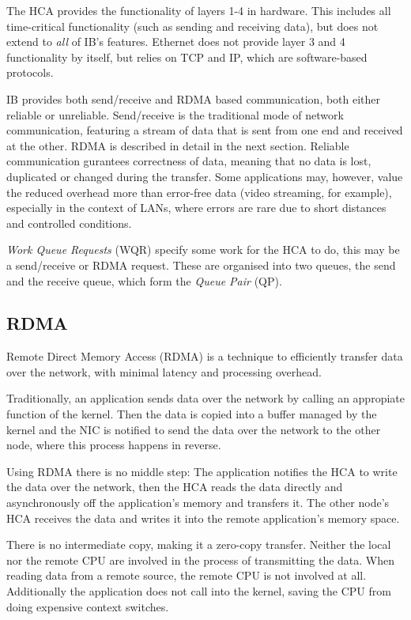 \documentclass[12pt, a4paper]{article}
\begin{document}
The HCA provides the functionality of layers 1-4 in hardware. This includes all time-critical functionality (such as sending and receiving data), but does not extend to \textit{all} of IB's features. Ethernet does not provide layer 3 and 4 functionality by itself, but relies on TCP and IP, which are software-based protocols.

IB provides both send/receive and RDMA based communication, both either reliable or unreliable. Send/receive is the traditional mode of network communication, featuring a stream of data that is sent from one end and received at the other. RDMA is described in detail in the next section. Reliable communication gurantees correctness of data, meaning that no data is lost, duplicated or changed during the transfer. Some applications may, however, value the reduced overhead more than error-free data (video streaming, for example), especially in the context of LANs, where errors are rare due to short distances and controlled conditions.

\textit{Work Queue Requests} (WQR) specify some work for the HCA to do, this may be a send/receive or RDMA request. These are organised into two queues, the send and the receive queue, which form the \textit{Queue Pair} (QP).

\subsection{RDMA}
Remote Direct Memory Access (RDMA) is a technique to efficiently transfer data over the network, with minimal latency and processing overhead.

Traditionally, an application sends data over the network by calling an appropiate function of the kernel. Then the data is copied into a buffer managed by the kernel and the NIC is notified to send the data over the network to the other node, where this process happens in reverse.

Using RDMA there is no middle step: The application notifies the HCA to write the data over the network, then the HCA reads the data directly and asynchronously off the application's memory and transfers it. The other node's HCA receives the data and writes it into the remote application's memory space.

There is no intermediate copy, making it a zero-copy transfer. Neither the local nor the remote CPU are involved in the process of transmitting the data. When reading data from a remote source, the remote CPU is not involved at all. Additionally the application does not call into the kernel, saving the CPU from doing expensive context switches.
\end{document}

